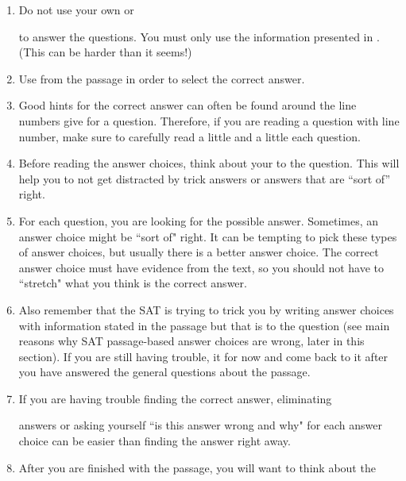 \begin{enumerate}[leftmargin=0cm,labelwidth=\itemindent,labelsep=0cm,align=left,label={\bfseries Strategy \#\arabic*:\ }]
\item Do not use your own \longline or

\longline to answer the questions. You must only use the information presented in \longline. (This can be harder than it seems!)
\item Use \longline from the passage in order to select the correct answer.

\bigskip
\item Good hints for the correct answer can often be found around the line numbers give for a question. Therefore, if you are reading a question with line number, make sure to carefully read a little \longline and a little \longline each question.  

\bigskip
\item Before reading the answer choices, think about your \longline to the question. This will help you to not get distracted by trick answers or answers that are “sort of” right. 

\bigskip
\item For each question, you are looking for the \longline possible answer. Sometimes, an answer choice might be ``sort of" right. It can be tempting to pick these types of answer choices, but usually there is a better answer choice. The correct answer choice must have evidence from the text, so you should not have to ``stretch" what you think is the correct answer.

\bigskip
\item Also remember that the SAT is trying to trick you by writing answer choices with information stated in the passage but that is \longline to the question (see main reasons why SAT passage-based answer choices are wrong, later in this section). If you are still having trouble, \longline it for now and come back to it after you have answered the general questions about the passage. 

\bigskip
\item If you are having trouble finding the correct answer, eliminating

\longline answers or asking yourself ``is this answer wrong and why" for each answer choice can be easier than finding the \longline answer right away.

\bigskip
\item After you are finished with the passage, you will want to think about the


\end{enumerate}
